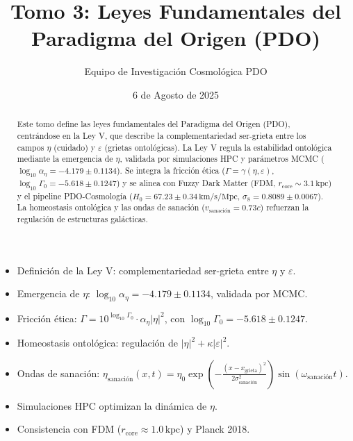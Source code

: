 \documentclass[a4paper,12pt]{article}
\newcommand{\eps}{\varepsilon}
\newcommand{\etaa}{\eta}
\newcommand{\rcore}{r_{\text{core}}}
\begin{document}
\title{Tomo 3: Leyes Fundamentales del Paradigma del Origen (PDO)}
\author{Equipo de Investigación Cosmológica PDO}
\date{6 de Agosto de 2025}
\maketitle

\begin{abstract}
Este tomo define las leyes fundamentales del Paradigma del Origen (PDO), centrándose en la Ley V, que describe la complementariedad ser-grieta entre los campos \(\etaa\) (cuidado) y \(\eps\) (grietas ontológicas). La Ley V regula la estabilidad ontológica mediante la emergencia de \(\etaa\), validada por simulaciones HPC y parámetros MCMC (\(\log_{10} \alpha_\eta = -4.179 \pm 0.1134\)). Se integra la fricción ética (\(\Gamma = \gamma(\etaa, \eps)\), \(\log_{10} \Gamma_0 = -5.618 \pm 0.1247\)) y se alinea con Fuzzy Dark Matter (FDM, \(\rcore \sim 3.1 \, \text{kpc}\)) y el pipeline PDO-Cosmología (\(H_0 = 67.23 \pm 0.34 \, \text{km/s/Mpc}\), \(\sigma_8 = 0.8089 \pm 0.0067\)). La homeostasis ontológica y las ondas de sanación (\(v_{\text{sanación}} = 0.73c\)) refuerzan la regulación de estructuras galácticas.
\end{abstract}

\begin{tcolorbox}[colback=blue!5!white,colframe=blue!75!black,title=Puntos Clave]
\begin{itemize}
    \item Definición de la Ley V: complementariedad ser-grieta entre \(\etaa\) y \(\eps\).
    \item Emergencia de \(\etaa\): \(\log_{10} \alpha_\eta = -4.179 \pm 0.1134\), validada por MCMC.
    \item Fricción ética: \(\Gamma = 10^{\log_{10} \Gamma_0} \cdot \alpha_\eta |\etaa|^2\), con \(\log_{10} \Gamma_0 = -5.618 \pm 0.1247\).
    \item Homeostasis ontológica: regulación de \(|\etaa|^2 + \kappa |\eps|^2\).
    \item Ondas de sanación: \(\etaa_{\text{sanación}}(x,t) = \eta_0 \exp\left(-\frac{(x-x_{\text{grieta}})^2}{2\sigma_{\text{sanación}}^2}\right) \sin(\omega_{\text{sanación}} t)\).
    \item Simulaciones HPC optimizan la dinámica de \(\etaa\).
    \item Consistencia con FDM (\(\rcore \approx 1.0 \, \text{kpc}\)) y Planck 2018.
\end{itemize}
\end{tcolorbox}
\end{document}
